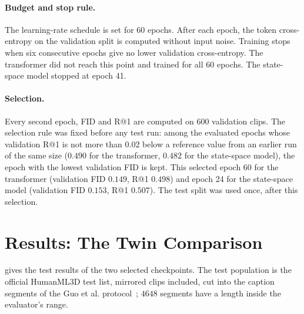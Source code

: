 \paragraph{Budget and stop rule.} The learning-rate schedule is set for 60 epochs. After each epoch, the token cross-entropy on the validation split is computed without input noise. Training stops when six consecutive epochs give no lower validation cross-entropy. The transformer did not reach this point and trained for all 60 epochs. The state-space model stopped at epoch 41.

\paragraph{Selection.} Every second epoch, FID and R@1 are computed on 600 validation clips. The selection rule was fixed before any test run: among the evaluated epochs whose validation R@1 is not more than $0.02$ below a reference value from an earlier run of the same size ($0.490$ for the transformer, $0.482$ for the state-space model), the epoch with the lowest validation FID is kept. This selected epoch 60 for the transformer (validation FID $0.149$, R@1 $0.498$) and epoch 24 for the state-space model (validation FID $0.153$, R@1 $0.507$). The test split was used once, after this selection.

\section{Results: The Twin Comparison}
\label{sec:gen_results}

 gives the test results of the two selected checkpoints. The test population is the official HumanML3D test list, mirrored clips included, cut into the caption segments of the Guo et al. protocol~\cite{guo2022humanml3d}; $4648$ segments have a length inside the evaluator's range.

